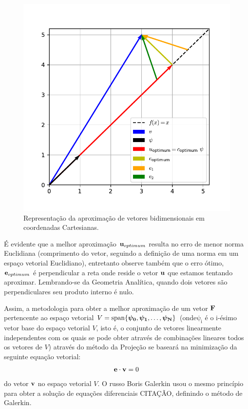  \begin{figure}[ht]
	\centering
	\includegraphics[width=\linewidth]{./figures/2dvectors.pdf}
	\caption{Representação da aproximação de vetores bidimensionais em coordenadas
    Cartesianas.  \label{fig:2dvecs}}
  \end{figure}

  É evidente que a melhor aproximação $\bm{\mathrm{u}}_{optimum}$ resulta no erro de menor norma Euclidiana (comprimento do vetor, seguindo a definição de uma norma em um espaço vetorial Euclidiano), entretanto observe também que o erro ótimo, $\bm{\mathrm{e}}_{optimum}$ é perpendicular a reta onde reside o vetor $\bm{\mathrm{u}}$ que estamos tentando aproximar. Lembrando-se da Geometria Analítica, quando dois vetores
  são perpendiculares seu produto interno é nulo.
  
  Assim, a metodologia para obter a melhor aproximação de um vetor $\bm{\mathrm{F}}$ pertencente ao espaço vetorial $V=\operatorname{span} \{\bm{\mathrm{\psi_0}},
      \bm{\mathrm{\psi_1}}, \dots, \bm{\mathrm{\psi_N}} \}$ (onde$\bm{\mathrm{\psi_i}}$ é o i-ésimo vetor base do espaço vetorial $V$, isto é, o conjunto de vetores linearmente independentes com os quais se pode obter através de combinações lineares todos os vetores de $V$) através do método da Projeção se baseará na minimização da seguinte equação vetorial:  $$ \bm{\mathrm{e}} \cdot \bm{\mathrm{v}} = 0$$  
  do vetor $\bm{\mathrm{v}}$ no espaço vetorial $V$. O russo Boris Galerkin usou o mesmo  princípio para obter a solução de equações diferenciais CITAÇÃO, definindo o método de Galerkin.
  
